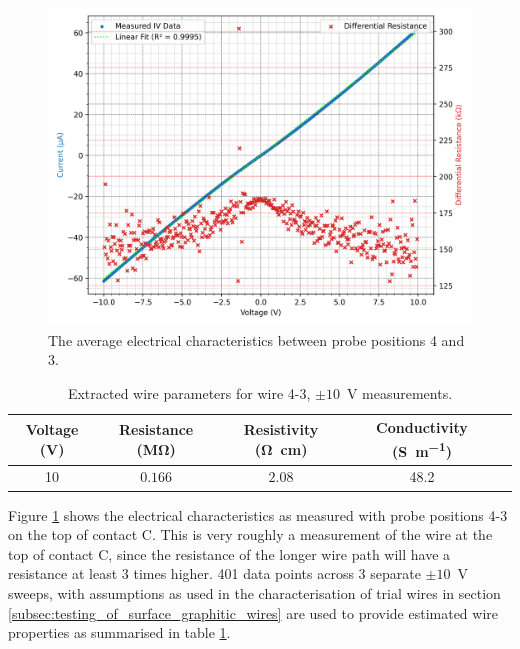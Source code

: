 \begin{refsection}
\begin{figure}[H]
    \centering
    \includegraphics[width=\linewidth]{Chapter7/Figs/Raster/Emitters/43 3x 10V.png}
    \caption{The average electrical characteristics between probe positions 4 and 3.}
    \label{fig:e_43_10v}
\end{figure}

\begin{table}[h!]
\centering
\begin{tabular}{|c|c|c|c|c|}
\hline
\textbf{Voltage (V)} & \textbf{Resistance (\si{\mega\ohm})}  & \textbf{Resistivity (\si{\ohm\centi\metre})} & \textbf{Conductivity (\si{\siemens\per\metre})} \\
\hline
10 & $0.166$ & $2.08$ & 48.2 \\
\hline
\end{tabular}
\caption{Extracted wire parameters for wire 4-3, $\pm10$~\si{\volt} measurements.}
\label{tab:43_e_wire_parameters_10v}
\end{table}

Figure \ref{fig:e_43_10v} shows the electrical characteristics as measured with probe positions 4-3 on the top of contact C. This is very roughly a measurement of the wire at the top of contact C, since the resistance of the longer wire path will have a resistance at least 3 times higher. 401 data points across 3 separate $\pm10$~\si{\volt} sweeps, with assumptions as used in the characterisation of trial wires in section \ref{subsec:testing_of_surface_graphitic_wires} are used to provide estimated wire properties as summarised in table \ref{tab:43_e_wire_parameters_10v}.


\end{refsection}
